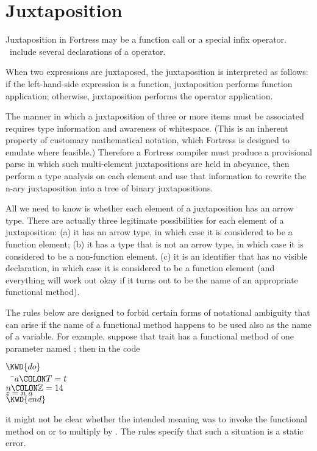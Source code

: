 %
%
%
%

\section{Juxtaposition}


Juxtaposition in Fortress may be a function call or
a special infix operator.  \Library\ include several declarations of
a  operator.

When two expressions are juxtaposed, the juxtaposition is interpreted as
follows:
if the left-hand-side expression is a function, juxtaposition performs
function application;
otherwise, juxtaposition performs the
 operator application.

The manner in which a juxtaposition of three or more items must be associated
requires type information and awareness of whitespace.  (This is an inherent property
of customary mathematical notation, which Fortress is designed to emulate where feasible.)
Therefore a Fortress compiler must produce a provisional parse in which such
multi-element juxtapositions are held in abeyance, then perform a type analysis
on each element and use that information to rewrite the n-ary juxtaposition
into a tree of binary juxtapositions.

All we need to know is whether each element of a
juxtaposition has an arrow type.
There are actually three legitimate possibilities for each element of a juxtaposition:
(a) it has an arrow type, in which case it is considered to be a function
element;
(b) it has a type that is not an arrow type, in which case it is considered
to be a non-function element.
(c) it is an identifier that has no visible declaration,
in which case it is considered to be a function element (and everything will work
out okay if it turns out to be the name of an appropriate functional method).

The rules below are designed to forbid certain forms of notational ambiguity
that can arise if the name of a functional method happens to be used also
as the name of a variable.  For example, suppose that trait  has a functional
method of one parameter named ; then in the code
\begin{Fortress}
\(\KWD{do}\)\\
{\tt~~}\pushtabs\=\+\(  a\COLON T = t\)\\
\(  n\COLON \mathbb{Z} = 14\)\\
\(  z = n\; a\)\-\\\poptabs
\(\KWD{end}\)
\end{Fortress}
it might not be clear whether the intended meaning was to invoke
the functional method  on  or to multiply  by .
The rules specify that such a situation is a static error.

